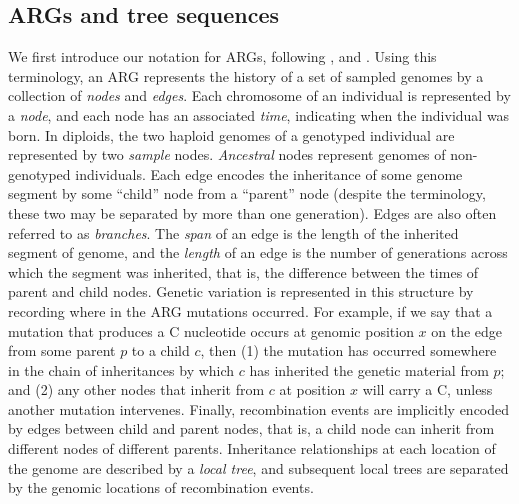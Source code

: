 



\subsection{ARGs and tree sequences}

We first introduce our notation for ARGs, following
\citet{kelleher2016efficient, kelleher2018efficient}, and \citet{wong2023general}.
%
Using this terminology,
an ARG represents the history of a set of sampled genomes
by a collection of \emph{nodes} and \emph{edges}.
%
Each chromosome of an individual is represented by a \emph{node},
and each node has an associated \emph{time},
indicating when the individual was born.
%
In diploids, the two haploid genomes of a genotyped individual are represented
by two \emph{sample} nodes.
%
\emph{Ancestral} nodes represent genomes of non-genotyped individuals.
%
Each edge encodes the inheritance of some genome segment
by some ``child'' node from a ``parent'' node
(despite the terminology, these two may be separated by more than one generation).
%
Edges are also often referred to as \emph{branches}.
%
The \emph{span} of an edge is the length of the inherited segment of genome,
and the \emph{length} of an edge is the number of generations across which
the segment was inherited, that is, the difference between the times of parent and child nodes.
%
Genetic variation is represented in this structure
by recording where in the ARG mutations occurred.
%
For example, if we say that a mutation that produces a C nucleotide
occurs at genomic position $x$ on the edge from some parent $p$
to a child $c$, then
(1) the mutation has occurred somewhere in the chain of inheritances
by which $c$ has inherited the genetic material from $p$; and
(2) any other nodes that inherit from $c$ at position $x$ will carry a C,
unless another mutation intervenes.
%
Finally, recombination events are implicitly encoded
by edges between child and parent nodes, that is,
a child node can inherit from different nodes of different parents.
%
Inheritance relationships at each location of the genome
are described by a \emph{local tree},
and subsequent local trees are separated by the genomic locations
of recombination events.

